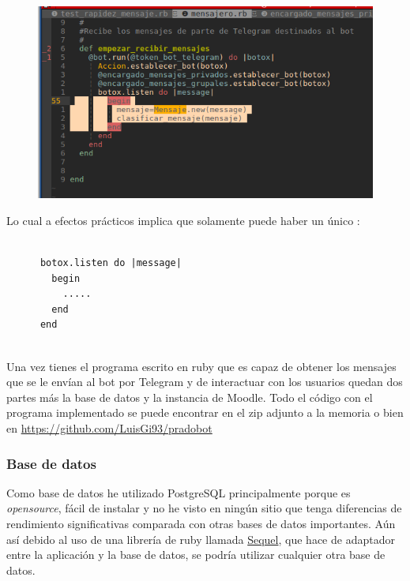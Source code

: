 \begin{figure}[H] %
\centering
\includegraphics[scale=0.7]{imagenes/random/Screenshot_2017-08-27_11-49-39.png}  %

\caption{ }\label{figura531}
\end{figure}

Lo cual a efectos prácticos implica que solamente puede haber un único :

\begin{lstlisting}

      botox.listen do |message|
        begin
          .....
        end
      end
 
\end{lstlisting}



\par 

 Una vez tienes el programa escrito en ruby que es capaz de obtener los mensajes que se le envían al bot por Telegram y de interactuar con los usuarios quedan dos partes más la base de datos y la instancia de Moodle. Todo el código con el programa implementado se puede encontrar en el zip adjunto a la memoria o bien en \url{https://github.com/LuisGi93/pradobot}

\subsubsection{Base de datos}

Como base de datos he utilizado PostgreSQL principalmente porque es \textit{opensource}, fácil de instalar y no he visto en ningún sitio que tenga diferencias de rendimiento significativas comparada con otras bases de datos importantes. Aún así debido al uso de una librería de ruby llamada \href{https://github.com/jeremyevans/sequel}{Sequel}, que hace de adaptador entre la aplicación y la base de datos, se podría utilizar cualquier otra base de datos.

